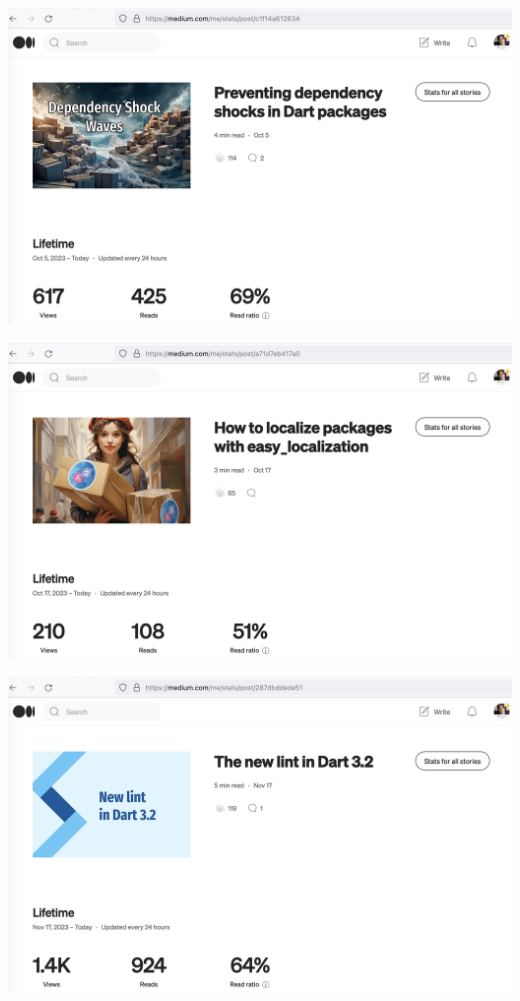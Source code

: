 \begin{center}
    \includegraphics[width=\textwidth]{2023-10-05_shock}
\end{center}

\begin{center}
    \includegraphics[width=\textwidth]{2023-10-17_localize}
\end{center}

\begin{center}
    \includegraphics[width=\textwidth]{2023-11-17_lint}
\end{center}

